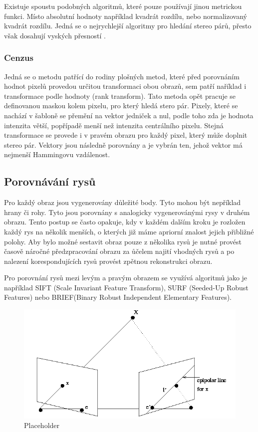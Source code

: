 \documentclass[twoside]{ctuthesis}
\begin{document}
Existuje spoustu podobných algoritmů, které pouze používají jinou metrickou funkci. Místo absolutní hodnoty například kvadrát rozdílu, nebo normalizovaný kvadrát rozdílu. Jedná se o nejrychlejší algoritmy pro hledání stereo párů, přesto však dosahují vyských přesností \cite{kuhl2005comparison}. 

\subsubsection{Cenzus}
\label{Sec:cenzus}
Jedná se o metodu patřící do rodiny plošných metod, které před porovnáním hodnot pixelů provedou určitou transformaci obou obrazů, sem patří naříklad i transformace podle hodnoty (rank transform). Tato metoda opět pracuje se definovanou maskou kolem pixelu, pro který hledá stero pár. Pixely, které se nachází v šabloně se přemění na vektor jedniček a nul, podle toho zda je hodnota intenzita větší, popřípadě menší než intenzita centrálního pixelu. Stejná transformace se provede i v pravém obrazu pro každý pixel, který může doplnit stereo pár. Vektory jsou následně porovnány a je vybrán ten, jehož vektor má nejmenší Hammingovu vzdálenost. \cite{kuhl2005comparison, brown2003advances_in_stereo}

\subsection{Porovnávání rysů}
Pro každý obraz jsou vygenerovány důležité body. Tyto mohou být nepříklad hrany či rohy. Tyto jsou porovnány s analogicky vygenerovánými rysy v druhém obrazu. Tento postup se často opakuje, kdy v každém dalším kroku je rozložen každý rys na několik menších, o kterých již máme apriorní znalost jejich přibližné polohy. Aby bylo možné sestavit obraz pouze z několika rysů je nutné provést časově náročné předzpracování obrazu za ůčelem najití vhodných rysů a po nalezení korespondujících rysů provést zpětnou rekonstrukci obrazu. \cite{brown2003advances_in_stereo}

Pro porovnání rysů mezi levým a pravým obrazem se využívá algoritmů jako je například SIFT (Scale Invariant Feature Transform), SURF (Seeded-Up Robust Features) nebo BRIEF(Binary Robust Independent Elementary Features).

\begin{figure}
    \centering
    \includegraphics[width = 0.8\linewidth]{pictures/epipolar.png}
    \caption{Placeholder}
    \label{fig:epipolar}
\end{figure}
\end{document}
